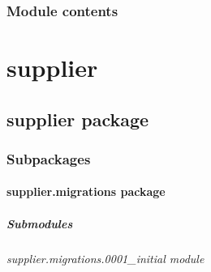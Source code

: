 \documentclass[a4paper,11pt,spanish]{sphinxmanual}
\begin{document}
\subsection{Module contents}
\label{\detokenize{api/sale/sale:module-sale}}\label{\detokenize{api/sale/sale:module-contents}}
\sphinxstepscope


\chapter{supplier}
\label{\detokenize{api/supplier/modules:supplier}}\label{\detokenize{api/supplier/modules::doc}}
\sphinxstepscope


\section{supplier package}
\label{\detokenize{api/supplier/supplier:supplier-package}}\label{\detokenize{api/supplier/supplier::doc}}

\subsection{Subpackages}
\label{\detokenize{api/supplier/supplier:subpackages}}
\sphinxstepscope


\subsubsection{supplier.migrations package}
\label{\detokenize{api/supplier/supplier.migrations:supplier-migrations-package}}\label{\detokenize{api/supplier/supplier.migrations::doc}}

\paragraph{Submodules}
\label{\detokenize{api/supplier/supplier.migrations:submodules}}
\sphinxstepscope


\subparagraph{supplier.migrations.0001\_initial module}
\label{\detokenize{api/supplier/supplier.migrations.0001_initial:module-supplier.migrations.0001_initial}}\label{\detokenize{api/supplier/supplier.migrations.0001_initial:supplier-migrations-0001-initial-module}}\label{\detokenize{api/supplier/supplier.migrations.0001_initial::doc}}
\end{document}
